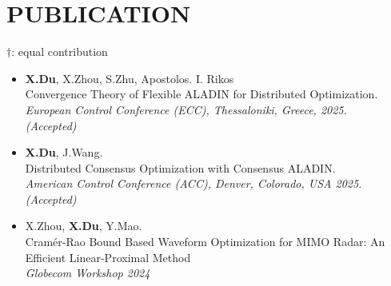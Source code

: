 \documentclass[paper=a4,fontsize=11pt]{scrartcl} %
\newcommand{\NewPart}[1]{\section*{\uppercase{#1}}}
\newcommand{\EducationEntry}[4]{
		\noindent \textbf{#1} \hfill      %
		\colorbox{White}{%
			\parbox{5cm}{%
			\hfill\color{Black}#2}} \par  %
		\noindent \textit{#3} \par        %
		\noindent\hangindent=2em\hangafter=0 \small #4 %
		\normalsize \par}
\begin{document}
\NewPart{PUBLICATION}{}
$\dag$:  equal contribution
\begin{itemize}
	
		
	\item  {\textbf{X.Du}, X.Zhou, S.Zhu, Apostolos. I. Rikos \\
		{ Convergence Theory of Flexible ALADIN for Distributed Optimization.}\\
		\emph{European Control Conference (ECC), Thessaloniki, Greece, 2025.\\(Accepted)
	} }
	
		\item  {\textbf{X.Du}, J.Wang. \\
		{ Distributed Consensus Optimization with Consensus ALADIN.}\\
		\emph{American Control Conference (ACC), Denver, Colorado, USA 2025.\\(Accepted)
	} }
	
		\item  {X.Zhou, \textbf{X.Du},   Y.Mao. \\
		{Cram\'er-Rao Bound Based Waveform Optimization for MIMO Radar: An Efficient Linear-Proximal Method}\\
		\emph{Globecom Workshop 2024\\
	} }
	
	
%	


\end{itemize}
\end{document}
